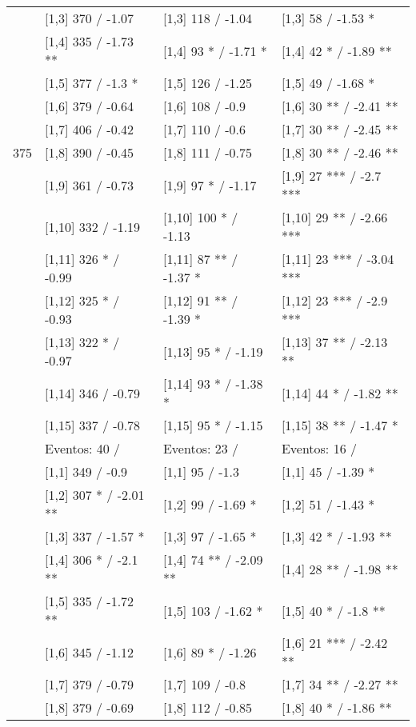 \begin{table}
\begin{tabular}[t]{llll}
 & {}[1,3] 370  / -1.07 & {}[1,3] 118  / -1.04 & {}[1,3] 58  / -1.53 *\\
\addlinespace
 & {}[1,4] 335  / -1.73 ** & {}[1,4] 93 * / -1.71 * & {}[1,4] 42 * / -1.89 **\\
 & {}[1,5] 377  / -1.3 * & {}[1,5] 126  / -1.25 & {}[1,5] 49  / -1.68 *\\
 & {}[1,6] 379  / -0.64 & {}[1,6] 108  / -0.9 & {}[1,6] 30 ** / -2.41 **\\
 & {}[1,7] 406  / -0.42 & {}[1,7] 110  / -0.6 & {}[1,7] 30 ** / -2.45 **\\
375 & {}[1,8] 390  / -0.45 & {}[1,8] 111  / -0.75 & {}[1,8] 30 ** / -2.46 **\\
\addlinespace
 & {}[1,9] 361  / -0.73 & {}[1,9] 97 * / -1.17 & {}[1,9] 27 *** / -2.7 ***\\
 & {}[1,10] 332  / -1.19 & {}[1,10] 100 * / -1.13 & {}[1,10] 29 ** / -2.66 ***\\
 & {}[1,11] 326 * / -0.99 & {}[1,11] 87 ** / -1.37 * & {}[1,11] 23 *** / -3.04 ***\\
 & {}[1,12] 325 * / -0.93 & {}[1,12] 91 ** / -1.39 * & {}[1,12] 23 *** / -2.9 ***\\
 & {}[1,13] 322 * / -0.97 & {}[1,13] 95 * / -1.19 & {}[1,13] 37 ** / -2.13 **\\
\addlinespace
 & {}[1,14] 346  / -0.79 & {}[1,14] 93 * / -1.38 * & {}[1,14] 44 * / -1.82 **\\
 & {}[1,15] 337  / -0.78 & {}[1,15] 95 * / -1.15 & {}[1,15] 38 ** / -1.47 *\\
 & Eventos:  40 / & Eventos:  23 / & Eventos:  16 /\\
 & {}[1,1] 349  / -0.9 & {}[1,1] 95  / -1.3 & {}[1,1] 45  / -1.39 *\\
 & {}[1,2] 307 * / -2.01 ** & {}[1,2] 99  / -1.69 * & {}[1,2] 51  / -1.43 *\\
\addlinespace
 & {}[1,3] 337  / -1.57 * & {}[1,3] 97  / -1.65 * & {}[1,3] 42 * / -1.93 **\\
 & {}[1,4] 306 * / -2.1 ** & {}[1,4] 74 ** / -2.09 ** & {}[1,4] 28 ** / -1.98 **\\
 & {}[1,5] 335  / -1.72 ** & {}[1,5] 103  / -1.62 * & {}[1,5] 40 * / -1.8 **\\
 & {}[1,6] 345  / -1.12 & {}[1,6] 89 * / -1.26 & {}[1,6] 21 *** / -2.42 **\\
 & {}[1,7] 379  / -0.79 & {}[1,7] 109  / -0.8 & {}[1,7] 34 ** / -2.27 **\\
\addlinespace
500 & {}[1,8] 379  / -0.69 & {}[1,8] 112  / -0.85 & {}[1,8] 40 * / -1.86 **\\

\end{tabular}
\end{table}
